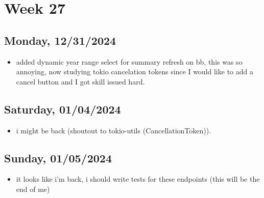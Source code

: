 \newpage
\section{Week 27}

\subsection{Monday, 12/31/2024}
\begin{itemize}
    \item added dynamic year range select for summary refresh on bb, this was so
        annoying, now studying tokio cancelation tokens since I would like to
        add a cancel button and I got skill issued hard.
\end{itemize}

\subsection{Saturday, 01/04/2024}
\begin{itemize}
    \item i might be back (shoutout to tokio-utils (CancellationToken)).
\end{itemize}

\subsection{Sunday, 01/05/2024}
\begin{itemize}
    \item it looks like i'm back, i should write tests for these endpoints (this
        will be the end of me)
\end{itemize}
